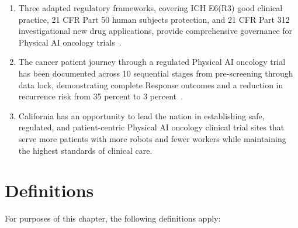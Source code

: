 \documentclass[11pt,letterpaper]{article}
\begin{document}
\begin{enumerate}[label=(\alph*)]
\item Three adapted regulatory frameworks, covering ICH E6(R3) good clinical
  practice, 21 CFR Part 50 human subjects protection, and 21 CFR Part 312
  investigational new drug applications, provide comprehensive governance for
  Physical AI oncology trials~\cite{iche6r3adapt,cfr50adapt,cfr312adapt}.

\item The cancer patient journey through a regulated Physical AI oncology trial
  has been documented across 10 sequential stages from pre-screening through
  data lock, demonstrating complete Response outcomes and a reduction in
  recurrence risk from 35 percent to 3 percent~\cite{patientjourney2026}.

\item California has an opportunity to lead the nation in establishing safe,
  regulated, and patient-centric Physical AI oncology clinical trial sites that
  serve more patients with more robots and fewer workers while maintaining the
  highest standards of clinical care.
\end{enumerate}

\section{Definitions}

For purposes of this chapter, the following definitions apply:
\end{document}
